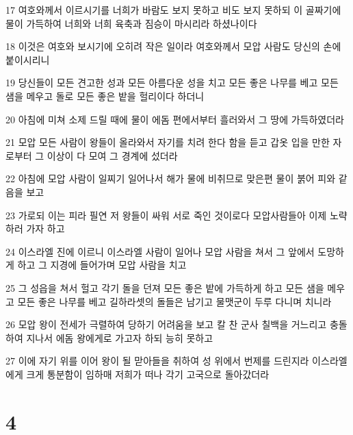 \par 17 여호와께서 이르시기를 너희가 바람도 보지 못하고 비도 보지 못하되 이 골짜기에 물이 가득하여 너희와 너희 육축과 짐승이 마시리라 하셨나이다
\par 18 이것은 여호와 보시기에 오히려 작은 일이라 여호와께서 모압 사람도 당신의 손에 붙이시리니
\par 19 당신들이 모든 견고한 성과 모든 아름다운 성을 치고 모든 좋은 나무를 베고 모든 샘을 메우고 돌로 모든 좋은 밭을 헐리이다 하더니
\par 20 아침에 미쳐 소제 드릴 때에 물이 에돔 편에서부터 흘러와서 그 땅에 가득하였더라
\par 21 모압 모든 사람이 왕들이 올라와서 자기를 치려 한다 함을 듣고 갑옷 입을 만한 자로부터 그 이상이 다 모여 그 경계에 섰더라
\par 22 아침에 모압 사람이 일찌기 일어나서 해가 물에 비취므로 맞은편 물이 붉어 피와 같음을 보고
\par 23 가로되 이는 피라 필연 저 왕들이 싸워 서로 죽인 것이로다 모압사람들아 이제 노략하러 가자 하고
\par 24 이스라엘 진에 이르니 이스라엘 사람이 일어나 모압 사람을 쳐서 그 앞에서 도망하게 하고 그 지경에 들어가며 모압 사람을 치고
\par 25 그 성읍을 쳐서 헐고 각기 돌을 던져 모든 좋은 밭에 가득하게 하고 모든 샘을 메우고 모든 좋은 나무를 베고 길하라셋의 돌들은 남기고 물맷군이 두루 다니며 치니라
\par 26 모압 왕이 전세가 극렬하여 당하기 어려움을 보고 칼 찬 군사 칠백을 거느리고 충돌하여 지나서 에돔 왕에게로 가고자 하되 능히 못하고
\par 27 이에 자기 위를 이어 왕이 될 맏아들을 취하여 성 위에서 번제를 드린지라 이스라엘에게 크게 통분함이 임하매 저희가 떠나 각기 고국으로 돌아갔더라

\chapter{4}

